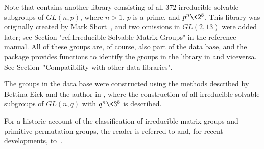 Note that {\GAP} contains another library consisting of all $372$ irreducible solvable
subgroups of $GL(n, p)$, where $n > 1$, $p$ is a prime, and $p^n \< 2^8$. This library 
was originally
created by Mark Short~\cite{Sho}, and two omissions in $GL(2,13)$ were added later; 
see Section "ref:Irreducible Solvable Matrix Groups" in the {\GAP} reference manual. 
All of these groups are,  of course, also part of the {\IRREDSOL} data base, and the
{\IRREDSOL} package provides functions to identify the groups in the
{\GAP} library in {\IRREDSOL} and viceversa. See
Section~"Compatibility with other data libraries".

The groups in the {\IRREDSOL} data base were constructed using the methods
described by Bettina Eick and the author in \cite{EH}, where the 
construction of all irreducible solvable subgroups of $GL(n, q)$ with $q^n \< 3^8$
is described.

For a historic account of the classification of irreducible matrix groups and
primitive permutation groups, the reader is referred to \cite{Sho} and, 
for recent developments, to~\cite{EH}.


